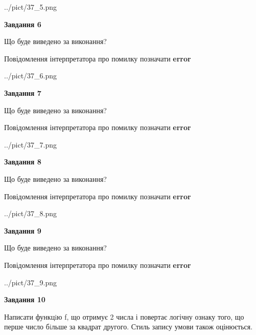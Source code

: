 \documentclass[12pt, ukrainian]{article}
\begin{document}
{\begin {large}
\begin{center}
	{../pict/37_5.png}
\end{center}
\newpage

{\begin {center}\textbf{Завдання 6}\end {center}}\par
Що буде виведено за виконання? \par
Повідомлення інтерпретатора про помилку позначати \textbf{error}

\begin{center}
	{../pict/37_6.png}
\end{center}
\newpage

{\begin {center}\textbf{Завдання 7}\end {center}}\par
Що буде виведено за виконання? \par
Повідомлення інтерпретатора про помилку позначати \textbf{error}

\begin{center}
	{../pict/37_7.png}
\end{center}
\newpage

{\begin {center}\textbf{Завдання 8}\end {center}}\par
Що буде виведено за виконання? \par
Повідомлення інтерпретатора про помилку позначати \textbf{error}

\begin{center}
	{../pict/37_8.png}
\end{center}
\newpage

{\begin {center}\textbf{Завдання 9}\end {center}}\par
Що буде виведено за виконання? \par
Повідомлення інтерпретатора про помилку позначати \textbf{error}

\begin{center}
	{../pict/37_9.png}
\end{center}
\newpage

{\begin {center}\textbf{Завдання 10}\end {center}}\par

Написати функцiю f, що отримує 2 числа і повертає логічну ознаку того, що перше число бiльше за квадрат другого. Стиль запису умови також оцінюється.\par
\newpage

\end {large}}
\end{document}
